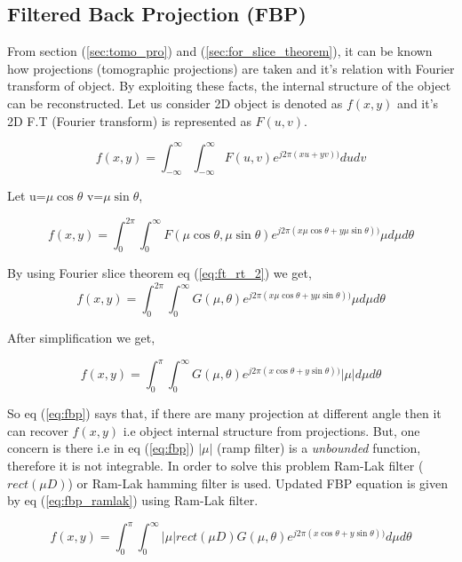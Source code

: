 \documentclass{report}
\begin{document}
\subsection{Filtered Back Projection (FBP)}\label{subsec:reconst_fbp}
From section (\ref{sec:tomo_pro}) and (\ref{sec:for_slice_theorem}), it can be known how projections (tomographic projections) are taken and it's relation with Fourier transform of object. By exploiting these facts, the internal structure of the object can be reconstructed. Let us consider 2D object is denoted as $f(x,y)$ and it's 2D F.T (Fourier transform) is represented as $F(u,v)$.

\begin{equation}\label{eq:inv_ft}
f(x,y) = \int_{-\infty}^{\infty} \int_{-\infty}^{\infty} F(u,v) e^{j2\pi(xu+yv))} dudv
\end{equation}

Let u=$\mu\cos\theta$ v=$\mu\sin\theta$,

\begin{equation}
f(x,y) = \int_{0}^{2\pi} \int_{0}^{\infty} F(\mu\cos\theta,\mu\sin\theta) e^{j2\pi(x\mu\cos\theta+y\mu\sin\theta))} \mu d\mu d\theta
\end{equation}

By using Fourier slice theorem eq (\ref{eq:ft_rt_2}) we get,
\begin{equation}
f(x,y) = \int_{0}^{2\pi} \int_{0}^{\infty} G(\mu,\theta) e^{j2\pi(x\mu\cos\theta+y\mu\sin\theta))} \mu d\mu d\theta
\end{equation}

After simplification we get,

\begin{equation}\label{eq:fbp}
f(x,y) = \int_{0}^{\pi} \int_{0}^{\infty} G(\mu,\theta) e^{j2\pi(x\cos\theta+y\sin\theta))} |\mu| d\mu d\theta
\end{equation}

\noindent
So eq (\ref{eq:fbp}) says that, if there are many projection at different angle then it can recover $f(x,y)$ i.e object internal structure from projections. But, one concern is there i.e in eq (\ref{eq:fbp}) $|\mu|$ (ramp filter) is a \textit{unbounded} function, therefore it is not integrable. In order to solve this problem Ram-Lak filter ($rect(\mu D)$) or Ram-Lak hamming filter is used. Updated FBP equation is given by eq (\ref{eq:fbp_ramlak}) using Ram-Lak filter.


\begin{equation}\label{eq:fbp_ramlak}
f(x,y) = \int_{0}^{\pi} \int_{0}^{\infty} |\mu| rect(\mu D) G(\mu,\theta) e^{j2\pi(x\cos\theta+y\sin\theta))}  d\mu d\theta
\end{equation}
\end{document}

